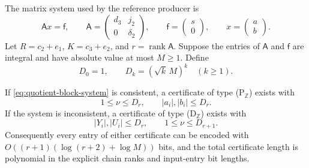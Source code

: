 The matrix system used by the reference producer is
\begin{equation}
 \label{eq:quotient-block-system}
 \mathsf A x=\mathsf f,\qquad
 \mathsf A=
 \begin{pmatrix}d_3&j_2\\0&\delta_2\end{pmatrix},\qquad
 \mathsf f=\begin{pmatrix}s\\0\end{pmatrix},\qquad
 x=\begin{pmatrix}a\\b\end{pmatrix}.
\end{equation}
Let $R=c_2+e_1$, $K=c_3+e_2$, and $r=\operatorname{rank}\mathsf A$.
Suppose the entries of $\mathsf A$ and $\mathsf f$ are integral and
have absolute value at most $M\geq1$. Define
\[
 D_0=1,\qquad D_k=(\sqrt{k}\,M)^k\quad(k\geq1).
\]

\begin{theorem}
\label{thm:quotient-minor-bound}
If \eqref{eq:quotient-block-system} is consistent, a certificate of type
{\rm(P$_{\mathbb Z}$)} exists with
\[
 1\leq\nu\leq D_r,\qquad
 |a_i|,|b_i|\leq D_r.
\]
If the system is inconsistent, a certificate of type
{\rm(D$_{\mathbb Z}$)} exists with
\[
 |Y_i|,|U_i|\leq D_r,\qquad
 1\leq\nu\leq D_{r+1}.
\]
Consequently every entry of either certificate can be encoded with
$O((r+1)(\log(r+2)+\log M))$ bits, and the total certificate length is
polynomial in the explicit chain ranks and input-entry bit lengths.
\end{theorem}

